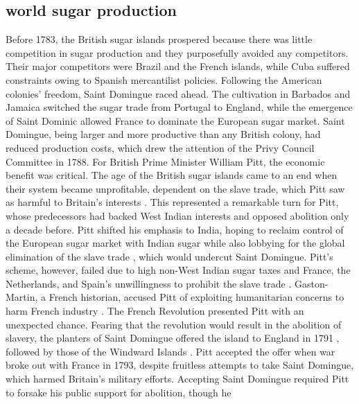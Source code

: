 \subsection{world sugar production}
Before 1783, the British sugar islands prospered because there was little competition in sugar production and they purposefully avoided any competitors. Their major competitors were Brazil and the French islands, while Cuba suffered constraints owing to Spanish mercantilist policies. Following the American colonies' freedom, Saint Domingue raced ahead. The cultivation in Barbados and Jamaica switched the sugar trade from Portugal to England, while the emergence of Saint Dominic allowed France to dominate the European sugar market. Saint Domingue, being larger and more productive than any British colony, had reduced production costs, which drew the attention of the Privy Council Committee in 1788. For British Prime Minister William Pitt, the economic benefit was critical. The age of the British sugar islands came to an end when their system became unprofitable, dependent on the slave trade, which Pitt saw as harmful to Britain's interests . This represented a remarkable turn for Pitt, whose predecessors had backed West Indian interests and opposed abolition only a decade before. Pitt shifted his emphasis to India, hoping to reclaim control of the European sugar market with Indian sugar  while also lobbying for the global elimination of the slave trade , which would undercut Saint Domingue. Pitt's scheme, however, failed due to high non-West Indian sugar taxes  and France, the Netherlands, and Spain's unwillingness to prohibit the slave trade . Gaston-Martin, a French historian, accused Pitt of exploiting humanitarian concerns to harm French industry . The French Revolution presented Pitt with an unexpected chance. Fearing that the revolution would result in the abolition of slavery, the planters of Saint Domingue offered the island to England in 1791 , followed by those of the Windward Islands . Pitt accepted the offer when war broke out with France in 1793, despite fruitless attempts to take Saint Domingue, which harmed Britain's military efforts. Accepting Saint Domingue required Pitt to forsake his public support for abolition, though he 